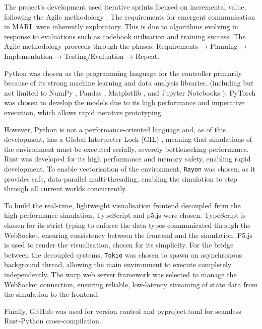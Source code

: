 The project's development used iterative sprints focused on incremental value, following the Agile methodology \cite{agile_guide}.
The requirements for emergent communication in MARL were inherently exploratory.
This is due to algorithms evolving in response to evaluations such as codebook utilisation and training success.
The Agile methodology proceeds through the phases: Requirements → Planning → Implementation → Testing/Evaluation → Repeat.

Python was chosen as the programming language for the controller primarily because of its strong machine learning and data analysis libraries.
(including but not limited to NumPy \cite{numpy}, Pandas \cite{pandas}, Matplotlib \cite{matplotlib}, and Jupyter Notebooks \cite{jupyter}).
PyTorch \cite{pytorch} was chosen to develop the models due to its high performance and imperative execution, which allows rapid iterative prototyping.

However, Python is not a performance-oriented language and, as of this development, has a Global Interpreter Lock (GIL) \cite{python_gil_wiki}, meaning that simulations of the environment must be executed serially, severely bottlenecking performance.
Rust was developed for its high performance and memory safety, enabling rapid development.
To enable vectorisation of the environment, \lstinline[language=Rust]|Rayon| \cite{rayon_rs} was chosen, as it provides safe, data-parallel multi-threading, enabling the simulation to step through all current worlds concurrently.

To build the real-time, lightweight visualisation frontend decoupled from the high-performance simulation, TypeScript \cite{typescript} and p5.js \cite{p5js} were chosen.
TypeScript \cite{typescript} is chosen for its strict typing to enforce the data types communicated through the WebSocket, ensuring consistency between the frontend and the simulation.
P5.js \cite{p5js} is used to render the visualisation, chosen for its simplicity.
For the bridge between the decoupled systems, \lstinline[language=Rust]|Tokio| \cite{tokio} was chosen to spawn an asynchronous background thread, allowing the main environment to execute completely independently.
The warp \cite{warp} web server framework was selected to manage the WebSocket connection, ensuring reliable, low-latency streaming of state data from the simulation to the frontend.

Finally, GitHub \cite{github} was used for version control and pyproject.toml for seamless Rust-Python cross-compilation.

